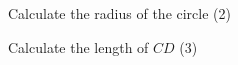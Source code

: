 \documentclass[12pt]{exam}
\begin{document}
\begin{questions}
\begin{parts}
\begin{subparts}
	\subpart[2] Calculate the radius of the circle \hfill (2)
	
	\vspace{0.5cm}
	
	\subpart[3] Calculate the length of $CD$ \hfill (3)

\end{subparts}


\end{parts}





\end{questions}
\end{document}

